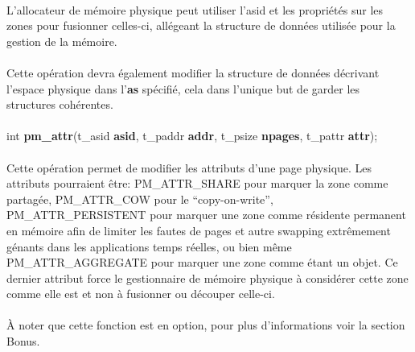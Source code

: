 \documentclass[10pt,a4wide]{article}
\begin{document}
\paragraph{}

L'allocateur de m\'emoire physique peut utiliser l'asid et les
propri\'et\'es sur les zones pour fusionner celles-ci, all\'egeant
la structure de donn\'ees utilis\'ee pour la gestion de la m\'emoire.

\paragraph{}

Cette op\'eration devra \'egalement modifier la structure de donn\'ees
d\'ecrivant l'espace physique dans l'\textbf{as} sp\'ecifi\'e, cela
dans l'unique but de garder les structures coh\'erentes.

\paragraph{}

\hspace{1.5cm}int \textbf{pm\_attr}(t\_asid \textbf{asid},
                                    t\_paddr \textbf{addr},
                                    t\_psize \textbf{npages},
                                    t\_pattr \textbf{attr});

\paragraph{}

Cette op\'eration permet de modifier les attributs d'une page physique.
Les attributs pourraient \^etre: PM\_ATTR\_SHARE pour marquer la zone
comme partag\'ee, PM\_ATTR\_COW pour le ``copy-on-write'',
PM\_ATTR\_PERSISTENT pour marquer une zone comme r\'esidente permanent
en m\'emoire afin de limiter les fautes de pages et autre swapping
extr\^emement g\'enants dans les applications temps r\'eelles, ou bien m\^eme
PM\_ATTR\_AGGREGATE pour marquer une zone comme \'etant un objet. Ce dernier
attribut force le gestionnaire de m\'emoire physique \`a consid\'erer
cette zone comme elle est et non \`a fusionner ou d\'ecouper celle-ci.

\paragraph{}

\`A noter que cette fonction est en option, pour plus d'informations voir
la section Bonus.
\end{document}
